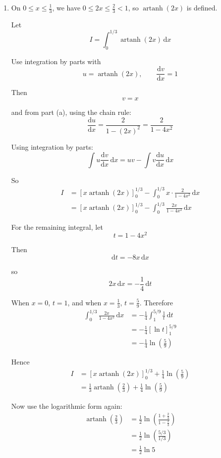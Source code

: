 \documentclass[leqno]{article}
\begin{document}
\begin{enumerate}[
  label=\textbf{\arabic*.},
  leftmargin=*,
  topsep=0pt,
  partopsep=0pt,
  parsep=0pt
]
\begin{djsSolution}
\begin{enumerate}[label=\textbf{(\alph*)}]
Hence
\[
\frac{\mathrm{d}}{\mathrm{d}x}\bigl(\operatorname{artanh}x\bigr)=\frac{1}{1-x^2}
\]

  \item On \(0\le x\le \frac13\), we have \(0\le 2x\le \frac23<1\), so \(\operatorname{artanh}(2x)\) is defined.

Let
\[
I=\int_0^{1/3}\operatorname{artanh}(2x)\,\mathrm{d}x
\]

Use integration by parts with
\[
u=\operatorname{artanh}(2x),\qquad \frac{\mathrm{d}v}{\mathrm{d}x}=1
\]

Then
\[
v=x
\]

and from part (a), using the chain rule:
\[
\frac{\mathrm{d}u}{\mathrm{d}x}=\frac{2}{1-(2x)^2}=\frac{2}{1-4x^2}
\]

Using integration by parts:
\[
\int u\frac{\mathrm{d}v}{\mathrm{d}x}\,\mathrm{d}x = uv - \int v\frac{\mathrm{d}u}{\mathrm{d}x}\,\mathrm{d}x
\]

So
\begin{align*}
I&=\left[x\operatorname{artanh}(2x)\right]_0^{1/3}-\int_0^{1/3}x\cdot \frac{2}{1-4x^2}\,\mathrm{d}x\\
&=\left[x\operatorname{artanh}(2x)\right]_0^{1/3}-\int_0^{1/3}\frac{2x}{1-4x^2}\,\mathrm{d}x
\end{align*}

For the remaining integral, let
\[
t=1-4x^2
\]

Then
\[
\mathrm{d}t=-8x\,\mathrm{d}x
\]

so
\[
2x\,\mathrm{d}x=-\frac14\,\mathrm{d}t
\]

When \(x=0\), \(t=1\), and when \(x=\frac13\), \(t=\frac59\). Therefore
\begin{align*}
\int_0^{1/3}\frac{2x}{1-4x^2}\,\mathrm{d}x
&=-\frac14\int_1^{5/9}\frac{1}{t}\,\mathrm{d}t\\
&=-\frac14\left[\ln t\right]_1^{5/9}\\
&=-\frac14\ln\left(\frac59\right)
\end{align*}

Hence
\begin{align*}
I&=\left[x\operatorname{artanh}(2x)\right]_0^{1/3}+\frac14\ln\left(\frac59\right)\\
&=\frac13\operatorname{artanh}\left(\frac23\right)+\frac14\ln\left(\frac59\right)
\end{align*}

Now use the logarithmic form again:
\begin{align*}
\operatorname{artanh}\left(\frac23\right)
&=\frac12\ln\left(\frac{1+\frac23}{1-\frac23}\right)\\
&=\frac12\ln\left(\frac{5/3}{1/3}\right)\\
&=\frac12\ln 5
\end{align*}


\end{enumerate}
\end{djsSolution}
\end{enumerate}
\end{document}
